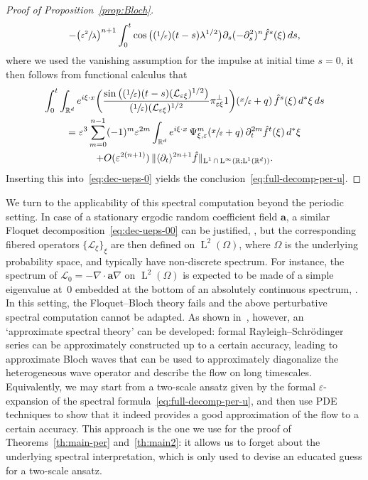 \documentclass[10pt]{amsart}
\newcommand{\Psfrac}[2]{(\sfrac{#1}{#2})}
\theoremstyle{plain}
\theoremstyle{definition}
\numberwithin{equation}{section}
\newcommand{\e}{\varepsilon}
\newcommand{\Lc}{\mathcal{L}}
\newcommand{\R}{\mathbb R}
\newcommand{\Aa}{\boldsymbol a}
\newcommand{\Ld}{\operatorname{L}}
\begin{document}
\begin{proof}[Proof of Proposition~\ref{prop:Bloch}]
\begin{multline*}
-\big(\sfrac{\e^2}{\lambda}\big)^{n+1}\int_0^t\cos\big(\Psfrac1\e(t-s)\lambda^{1/2}\big)\partial_s(-\partial_s^2)^{n}\hat f^s(\xi)\,ds,
\end{multline*}
where we used the vanishing assumption for the impulse at initial time $s=0$,
it then follows from functional calculus that
\begin{multline*}
\int_0^t\int_{\R^d}e^{i\xi\cdot x} \bigg(\frac{\sin\big(\Psfrac1\e(t-s)(\Lc_{\e \xi})^{1/2}\big)}{\Psfrac1\e(\Lc_{\e \xi})^{1/2}}\pi_{\e\xi}^\bot1\bigg)(\sfrac x\e+q)\,\hat f^s(\xi)\,d^*\xi\,ds\\
=\e^3\sum_{{m}=0}^{n-1}(-1)^{m}\e^{2{m}}\int_{\R^d}e^{i\xi\cdot x}\,\Psi_{\xi,\e}^{{m}}(\sfrac x\e+q)\,\partial_t^{2{m}}\hat f^t(\xi)\,d^*\xi\\
+O(\e^{2(n+1)})\,\|\langle\partial_t\rangle^{2n+1}\hat f\|_{\Ld^1\cap\Ld^\infty(\R;\Ld^1(\R^d))}.
\end{multline*}
Inserting this into~\eqref{eq:dec-ueps-0} yields the conclusion~\eqref{eq:full-decomp-per-u}.
\end{proof}

We turn to the applicability of this spectral computation beyond the periodic setting.
In case of a stationary ergodic random coefficient field $\Aa$, a similar Floquet decomposition~\eqref{eq:dec-ueps-00} can be justified, \cf \cite{DGS,DS1}, but the corresponding fibered operators $\{\Lc_{\xi}\}_\xi$ are then defined on $\Ld^2(\Omega)$, where $\Omega$ is the underlying probability space, and typically have non-discrete spectrum. For instance, the spectrum of $\Lc_0=-\nabla\cdot\Aa\nabla$ on $\Ld^2(\Omega)$ is expected to be made of a simple eigenvalue at~$0$ embedded at the bottom of {an} absolutely continuous spectrum, \cf \cite{DS1}.
In this setting, the Floquet--Bloch theory fails and the above perturbative spectral computation cannot be adapted.
As shown in~\cite{BG,DGS}, however, an `approximate spectral theory' can be developed: formal Rayleigh--Schrödinger series can be approximately constructed up to a certain accuracy, leading to approximate Bloch waves that can be used to approximately diag\-o\-nalize the heterogeneous wave operator and describe the flow on long timescales.
Equivalently, we may start from a two-scale ansatz given by the formal $\e$-expansion of the spectral formula~\eqref{eq:full-decomp-per-u}, and then use PDE techniques to show that it indeed provides a good approximation of the flow to a certain accuracy. This approach is the one we use for the proof of Theorems~\ref{th:main-per} and~\ref{th:main2}: { it allows us to forget about the underlying spectral interpretation, which is only used to devise an educated guess for a two-scale ansatz.}
\end{document}
